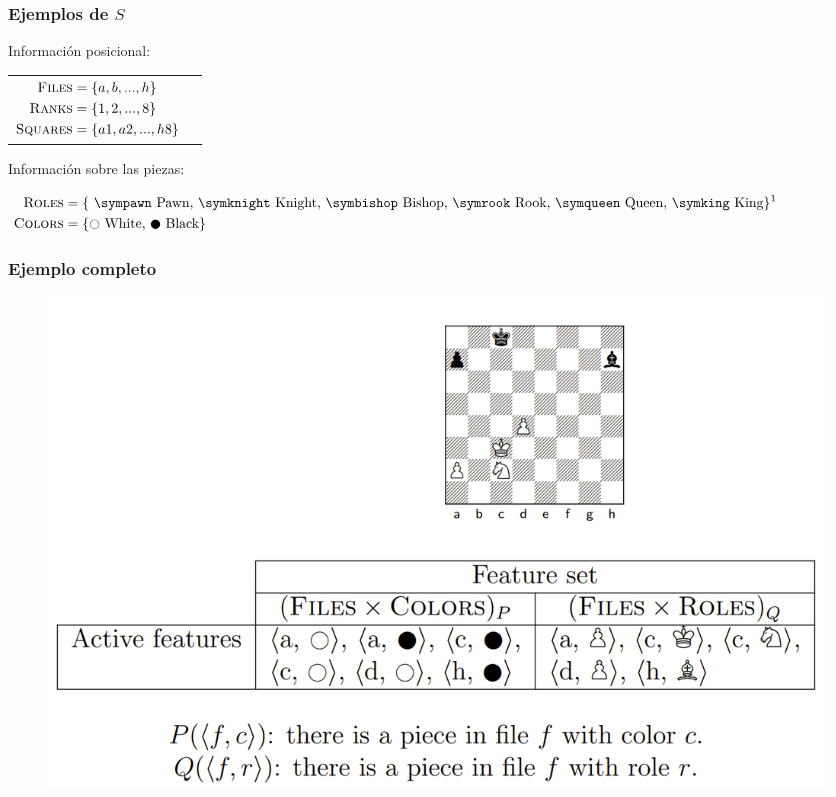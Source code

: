 \begin{frame}
\frametitle{Ejemplos de $S$}
Información posicional:

\begin{center}
\begin{tabular}{cc}

$\begin{aligned}[t]
\textsc{Files} &= \{a, b, ..., h\} \\
\textsc{Ranks} &= \{1, 2, ..., 8\} \\
\textsc{Squares} &= \{a1, a2, ..., h8\}
\end{aligned}$

&

\raisebox{-10ex}{
\chessboard[
    clearboard,
    tinyboard,
    showmover=false,
    pgfstyle={text},
    text=\fontsize{1.2ex}{1.2ex}\bfseries\sffamily \currentwq,
    markboard
]
}

\end{tabular}
\end{center}

Información sobre las piezas:

\begin{center}
$\begin{aligned}[t]
\featureset{Roles} &= \text{\{
    \sympawn\ Pawn,
    \symknight\ Knight,
    \symbishop\ Bishop,
    \symrook\ Rook,
    \symqueen\ Queen,
    \symking\ King\}}\textsuperscript{1} \\
\featureset{Colors} &= \text{\{\white\ White, \black\ Black\}}
\end{aligned}$
\end{center}


\end{frame}


\begin{frame}
\frametitle{Ejemplo completo}
\begin{figure}
\centering
\includegraphics[width=1.0\linewidth]{../assets/slides/fs.png}
\end{figure}
\end{frame}
